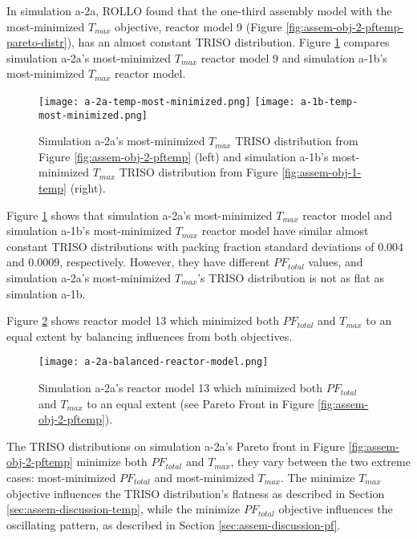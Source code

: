 In simulation a-2a, \gls{ROLLO} found that the one-third assembly model with the 
most-minimized $T_{max}$ objective, reactor model 9 (Figure 
\ref{fig:assem-obj-2-pftemp-pareto-distr}), has an almost constant TRISO distribution.
Figure \ref{fig:a-2a-temp-triso-comparison} compares simulation a-2a's most-minimized 
$T_{max}$ reactor model 9 and simulation a-1b's most-minimized $T_{max}$ reactor model. 
\begin{figure}[htbp!]
    \centering
    \texttt{[image: a-2a-temp-most-minimized.png]} 
    \texttt{[image: a-1b-temp-most-minimized.png]} 
    \caption{Simulation a-2a's most-minimized $T_{max}$ TRISO distribution 
    from Figure \ref{fig:assem-obj-2-pftemp} (left) and simulation a-1b's 
    most-minimized $T_{max}$ TRISO distribution from Figure 
    \ref{fig:assem-obj-1-temp} (right).}
    \label{fig:a-2a-temp-triso-comparison}
\end{figure}
Figure \ref{fig:a-2a-temp-triso-comparison} shows that simulation a-2a's most-minimized 
$T_{max}$ reactor model and simulation a-1b's most-minimized $T_{max}$ reactor model 
have similar almost constant TRISO distributions with packing fraction standard 
deviations of $0.004$ and $0.0009$, respectively.
However, they have different $PF_{total}$ values, and simulation a-2a's most-minimized 
$T_{max}$'s TRISO distribution is not as flat as simulation a-1b. 

Figure \ref{fig:a-2a-balanced-reactor-model} shows reactor model 13 which 
minimized both $PF_{total}$ and $T_{max}$ to an equal extent by balancing influences 
from both objectives. 
\begin{figure}[htbp!]
    \centering
    \texttt{[image: a-2a-balanced-reactor-model.png]} 
    \caption{Simulation a-2a's reactor model 13 which minimized both $PF_{total}$ and $T_{max}$ 
    to an equal extent (see Pareto Front in Figure \ref{fig:assem-obj-2-pftemp}).}
    \label{fig:a-2a-balanced-reactor-model}
\end{figure}
The \gls{TRISO} distributions on simulation a-2a's Pareto front in Figure 
\ref{fig:assem-obj-2-pftemp} minimize both $PF_{total}$ and $T_{max}$, they vary
between the two extreme cases: most-minimized $PF_{total}$ and most-minimized $T_{max}$. 
The minimize $T_{max}$ objective influences the TRISO distribution's flatness as 
described in Section \ref{sec:assem-discussion-temp}, while 
the minimize $PF_{total}$ objective influences the oscillating pattern, as described 
in Section \ref{sec:assem-discussion-pf}.

